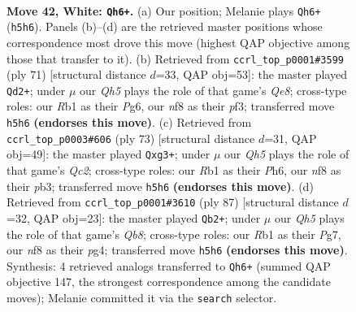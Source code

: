 \documentclass[11pt]{article}
\begin{document}
\clearpage

\begin{figure}[p]\centering
\begin{subfigure}{0.46\textwidth}\centering
\resizebox{\linewidth}{!}{%
\newchessgame
\chessboard[
  setfen={5n2/8/5k2/pqp4Q/8/1P6/P7/1R4K1 w - - 0 42},
  showmover=false,
  pgfstyle=straightmove, color=movearrow, markmove={h5-h6}
]}
\caption{}
\end{subfigure}\hfill
\begin{subfigure}{0.46\textwidth}\centering
\resizebox{\linewidth}{!}{%
\newchessgame
\chessboard[
  setfen={6k1/5p2/p5p1/8/2Q4P/5P2/PP4K1/4q3 b - - 2 36},
  showmover=false,
  pgfstyle=straightmove, color=movearrow, markmove={e1-d2}
]}
\caption{}
\end{subfigure}
\\[4pt]
\begin{subfigure}{0.46\textwidth}\centering
\resizebox{\linewidth}{!}{%
\newchessgame
\chessboard[
  setfen={8/2q1kp2/4p2p/8/4Q2P/1P4P1/4B3/6K1 b - - 0 37},
  showmover=false,
  pgfstyle=straightmove, color=movearrow, markmove={c7-g3}
]}
\caption{}
\end{subfigure}\hfill
\begin{subfigure}{0.46\textwidth}\centering
\resizebox{\linewidth}{!}{%
\newchessgame
\chessboard[
  setfen={5k2/6p1/7p/1P6/Q2p2P1/7P/3K4/1q6 b - - 2 44},
  showmover=false,
  pgfstyle=straightmove, color=movearrow, markmove={b1-b2}
]}
\caption{}
\end{subfigure}
\caption{\textbf{Move 42, White: \texttt{Qh6+}.} (a) Our position; Melanie plays \texttt{Qh6+} (\texttt{h5h6}). Panels (b)--(d) are the retrieved master positions whose correspondence most drove this move (highest QAP objective among those that transfer to it). (b) Retrieved from \texttt{ccrl\_top\_p0001\#3599} (ply 71) [structural distance $d$=33, QAP obj=53]: the master played \texttt{Qd2+}; under $\mu$ our \emph{Qh5} plays the role of that game's \emph{Qe8}; cross-type roles: our \emph{R}b1 as their \emph{P}g6, our \emph{n}f8 as their \emph{p}f3; transferred move \texttt{h5h6} \textbf{(endorses this move)}. (c) Retrieved from \texttt{ccrl\_top\_p0003\#606} (ply 73) [structural distance $d$=31, QAP obj=49]: the master played \texttt{Qxg3+}; under $\mu$ our \emph{Qh5} plays the role of that game's \emph{Qc2}; cross-type roles: our \emph{R}b1 as their \emph{P}h6, our \emph{n}f8 as their \emph{p}b3; transferred move \texttt{h5h6} \textbf{(endorses this move)}. (d) Retrieved from \texttt{ccrl\_top\_p0001\#3610} (ply 87) [structural distance $d$=32, QAP obj=23]: the master played \texttt{Qb2+}; under $\mu$ our \emph{Qh5} plays the role of that game's \emph{Qb8}; cross-type roles: our \emph{R}b1 as their \emph{P}g7, our \emph{n}f8 as their \emph{p}g4; transferred move \texttt{h5h6} \textbf{(endorses this move)}. Synthesis: 4 retrieved analogs transferred to \texttt{Qh6+} (summed QAP objective 147, the strongest correspondence among the candidate moves); Melanie committed it via the \texttt{search} selector.}
\label{fig:thought-m82}
\end{figure}
\end{document}

